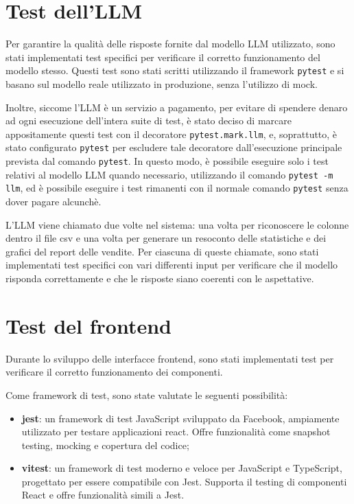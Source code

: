 \section{Test dell’LLM}

Per garantire la qualità delle risposte fornite dal modello LLM utilizzato, sono stati implementati test specifici per verificare il corretto funzionamento del modello stesso. Questi test sono stati scritti utilizzando il framework \texttt{pytest} e si basano sul modello reale utilizzato in produzione, senza l'utilizzo di mock.

Inoltre, siccome l'LLM è un servizio a pagamento, per evitare di spendere denaro ad ogni esecuzione dell'intera suite di test, è stato deciso di marcare appositamente questi test con il decoratore \texttt{pytest.mark.llm}, e, soprattutto, è stato configurato \texttt{pytest} per escludere tale decoratore dall'esecuzione principale prevista dal comando \texttt{pytest}.
In questo modo, è possibile eseguire solo i test relativi al modello LLM quando necessario, utilizzando il comando \texttt{pytest -m llm}, ed è possibile eseguire i test rimanenti con il normale comando \texttt{pytest} senza dover pagare alcunchè.

L'LLM viene chiamato due volte nel sistema: una volta per riconoscere le colonne dentro il file \gls{csv} e una volta per generare un resoconto delle statistiche e dei grafici del report delle vendite. Per ciascuna di queste chiamate, sono stati implementati test specifici con vari differenti input per verificare che il modello risponda correttamente e che le risposte siano coerenti con le aspettative.


\section{Test del frontend}

Durante lo sviluppo delle interfacce frontend, sono stati implementati test per verificare il corretto funzionamento dei componenti. 

Come framework di test, sono state valutate le seguenti possibilità:
\begin{itemize}
    \item \textbf{\gls{jest}}: un framework di test JavaScript sviluppato da Facebook, ampiamente utilizzato per testare applicazioni \gls{react}. Offre funzionalità come snapshot testing, mocking e copertura del codice;
    \item \textbf{\gls{vitest}}: un framework di test moderno e veloce per JavaScript e TypeScript, progettato per essere compatibile con Jest. Supporta il testing di componenti React e offre funzionalità simili a Jest.
\end{itemize}

